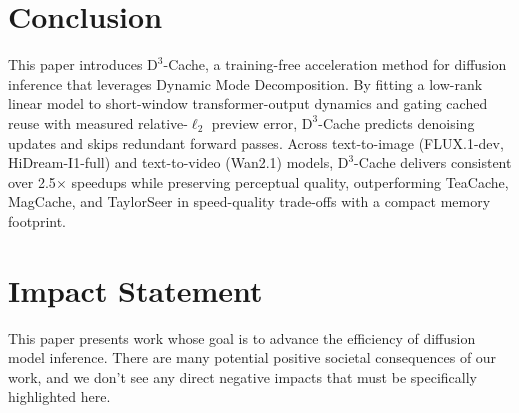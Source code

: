 \section{Conclusion}\label{sec:conclusion}

This paper introduces $\mathrm{D}^3$-Cache,
a training-free acceleration method
for diffusion inference
that leverages Dynamic Mode Decomposition.
By fitting a low-rank linear model
to short-window transformer-output dynamics
and gating cached reuse with measured relative-\( \ell_2 \) preview error,
$\mathrm{D}^3$-Cache predicts denoising updates
and skips redundant forward passes.
Across text-to-image (FLUX.1-dev, HiDream-I1-full)
and text-to-video (Wan2.1) models,
$\mathrm{D}^3$-Cache delivers consistent over 2.5$\times$ speedups
while preserving perceptual quality,
outperforming TeaCache, MagCache, and TaylorSeer
in speed-quality trade-offs
with a compact memory footprint.

\section*{Impact Statement}

This paper presents work whose goal
is to advance the efficiency of diffusion model inference.
There are many potential positive societal consequences of our work,
and we don't see any direct negative impacts
that must be specifically highlighted here.
